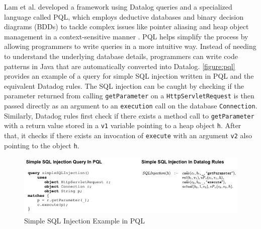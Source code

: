 Lam et al. developed a framework using Datalog queries and a specialized language called PQL, which employs deductive databases and binary decision diagrams (BDDs) to tackle complex issues like pointer aliasing and heap object management in a context-sensitive manner \cite{Lam2005}. PQL helps simplify the process by allowing programmers to write queries in a more intuitive way. Instead of needing to understand the underlying database details, programmers can write code patterns in Java that are automatically converted into Datalog. \autoref{figure:pql} provides an example of a query for simple SQL injection written in PQL and the equivalent Datadog rules. The SQL injection can be caught by checking if the parameter returned from calling \texttt{getParameter} on a \texttt{HttpServletRequest} is then passed directly as an argument to an \texttt{execution} call on the database \texttt{Connection}. Similarly, Datadog rules first check if there exists a method call to \texttt{getParameter} with a return value stored in a \texttt{v1} variable pointing to a heap object \texttt{h}. After that, it checks if there exists an invocation of \texttt{execute} with an argument \texttt{v2} also pointing to the object \texttt{h}.

\begin{figure}[h]
    \centering
    \includegraphics[width=1\textwidth]{Packages/PQL.png}
    \caption{Simple SQL Injection Example in PQL \cite{Lam2005}}
    \label{figure:pql}
\end{figure}

\newpage
